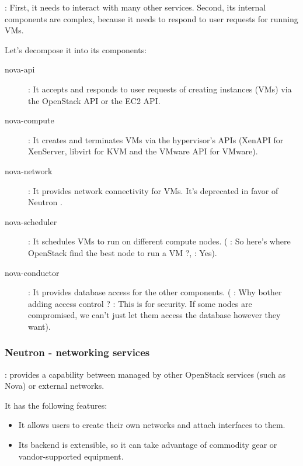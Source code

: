 \documentclass[dvipsnames]{article}
\begin{document}
 : First, it needs to interact with many other services. Second,
its internal components are complex, because it needs to respond to user
requests for running VMs.

Let's decompose it into its components:

\begin{description}
\item[nova-api] : It accepts and responds to user requests of creating instances
  (VMs) via the OpenStack API or the EC2 API.
\item[nova-compute] : It creates and terminates VMs via the hypervisor's APIs
  (XenAPI for XenServer, libvirt for KVM and the VMware API for VMware).
\item[nova-network] : It provides network connectivity for VMs. It's deprecated
  in favor of Neutron .
\item[nova-scheduler] : It schedules VMs to run on different compute nodes.
  ( : So here's where OpenStack find the best node to run a VM ?,
   : Yes).
\item[nova-conductor] : It provides database access for the other components.
  ( : Why bother adding access control ?  : This is
  for security. If some nodes are compromised, we can't just let them access the
  database however they want).
\end{description}

\subsubsection{Neutron - networking services}

 :  provides a 
capability between  managed by other OpenStack services (such as Nova) or
external networks.

It has the following features:

\begin{itemize}
\item It allows users to create their own networks and attach interfaces to them.
\item Its backend is extensible, so it can take advantage of commodity gear or
  vandor-supported equipment.
\end{itemize}
\end{document}
